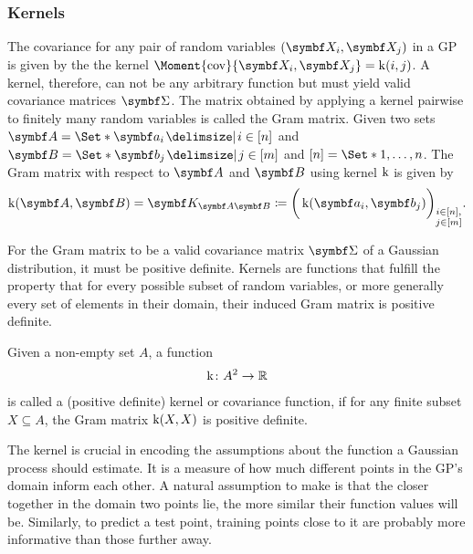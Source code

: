 \subsubsection{Kernels}
The covariance for any pair of random variables $(\rv{X}_i, \mat{X}_j)$ in a GP is given by the the kernel $\Moment{\cov}{\rv{X}_i, \rv{X}_j} = \K(i, j)$.
A kernel, therefore, can not be any arbitrary function but must yield valid covariance matrices $\mat{\Sigma}$.
The matrix obtained by applying a kernel pairwise to finitely many random variables is called the Gram matrix.
Given two sets $\mat{A} = \Set*{\mat{a}_i \with i \in [n]}$ and $\mat{B} = \Set*{\mat{b}_j \with j \in [m]}$ and $[n] = \Set*{1, \dots, n}$.
The Gram matrix with respect to $\mat{A}$ and $\mat{B}$ using kernel $\operatorname{k}$ is given by
\begin{align}
    \K(\mat{A}, \mat{B}) = \mat{K_{\mat{A}\mat{B}}} \coloneqq \bigg( \K(\mat{a}_i, \mat{b}_j) \bigg)_{\substack{i \in [n], \\ j \in [m]}}.
\end{align}

For the Gram matrix to be a valid covariance matrix $\mat{\Sigma}$ of a Gaussian distribution, it must be positive definite.
Kernels are functions that fulfill the property that for every possible subset of random variables, or more generally every set of elements in their domain, their induced Gram matrix is positive definite.
\begin{definition}[Kernel]
    Given a non-empty set $A$, a function
    \begin{align}
        \operatorname{k} \colon A^2 \to \mathbb{R}
    \end{align}
    is called a (positive definite) kernel or covariance function, if for any finite subset $X \subseteq A$, the Gram matrix $\operatorname{k}(X, X)$ is positive definite.
\end{definition}
The kernel is crucial in encoding the assumptions about the function a Gaussian process should estimate.
It is a measure of how much different points in the GP's domain inform each other.
A natural assumption to make is that the closer together in the domain two points lie, the more similar their function values will be.
Similarly, to predict a test point, training points close to it are probably more informative than those further away.

